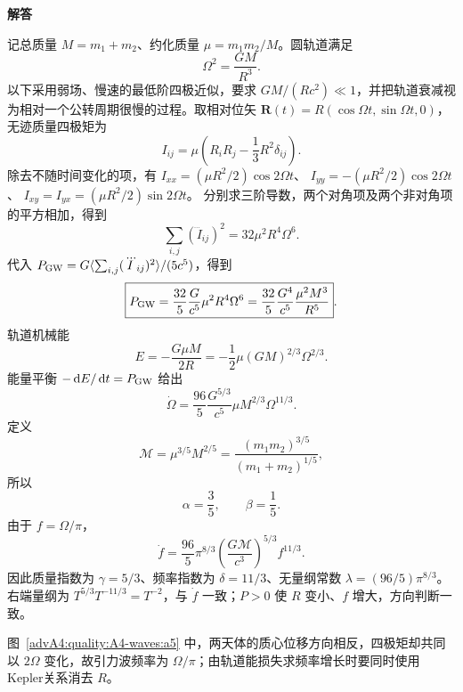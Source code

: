\begin{advsolution}
\begin{center}\begin{minipage}{.96\linewidth}\centering
\raggedright{\bfseries\color{DeepBlue}解答}\par\smallskip\centering

\label{advA4:quality:A4-waves:a5}
\end{minipage}\end{center}

记总质量 $M=m_1+m_2$、约化质量
$\mu=m_1m_2/M$。圆轨道满足
\[
 \Omega^2=\frac{GM}{R^3}.
\]
以下采用弱场、慢速的最低阶四极近似，要求 $GM/(Rc^2)\ll1$，并把轨道衰减视为相对一个公转周期很慢的过程。取相对位矢
$\boldsymbol R(t)=R(\cos\Omega t,\sin\Omega t,0)$，无迹质量四极矩为
\[
 I_{ij}=\mu\left(R_iR_j-\frac13R^2\delta_{ij}\right).
\]
除去不随时间变化的项，有
$I_{xx}=(\mu R^2/2)\cos2\Omega t$、
$I_{yy}=-(\mu R^2/2)\cos2\Omega t$、
$I_{xy}=I_{yx}=(\mu R^2/2)\sin2\Omega t$。
分别求三阶导数，两个对角项及两个非对角项的平方相加，得到
\[
 \sum_{i,j}(\dddot I_{ij})^2=32\mu^2R^4\Omega^6.
\]
代入 $P_{\rm GW}=G\langle\sum_{i,j}(\dddot I_{ij})^2\rangle/(5c^5)$，得到
\[
 \boxed{P_{\rm GW}=\frac{32}{5}\frac{G}{c^5}
 \mu^2R^4\Omega^6
 =\frac{32}{5}\frac{G^4}{c^5}
 \frac{\mu^2M^3}{R^5}}.
\]
轨道机械能
\[
 E=-\frac{G\mu M}{2R}
 =-\frac12\mu(GM)^{2/3}\Omega^{2/3}.
\]
能量平衡 $-\mathop{}\!\mathrm d E/\mathop{}\!\mathrm d t=P_{\rm GW}$ 给出
\[
 \dot\Omega=\frac{96}{5}\frac{G^{5/3}}{c^5}
 \mu M^{2/3}\Omega^{11/3}.
\]
定义
\[
 \boxed{\mathcal M=\mu^{3/5}M^{2/5}
 =\frac{(m_1m_2)^{3/5}}{(m_1+m_2)^{1/5}}},
\]
所以
\[
 \boxed{\alpha=\frac35,\qquad\beta=\frac15}.
\]
由于 $f=\Omega/\pi$，
\[
 \boxed{\dot f=\frac{96}{5}\pi^{8/3}
 \left(\frac{G\mathcal M}{c^3}\right)^{5/3}f^{11/3}}.
\]
因此质量指数为 $\gamma=5/3$、频率指数为
$\delta=11/3$、无量纲常数
$\lambda=(96/5)\pi^{8/3}$。右端量纲为
$T^{5/3}T^{-11/3}=T^{-2}$，与 $\dot f$ 一致；$P>0$ 使
$R$ 变小、$f$ 增大，方向判断一致。

图~\ref{advA4:quality:A4-waves:a5} 中，两天体的质心位移方向相反，四极矩却共同以 $2\Omega$ 变化，故引力波频率为 $\Omega/\pi$；由轨道能损失求频率增长时要同时使用Kepler关系消去 $R$。
\end{advsolution}
